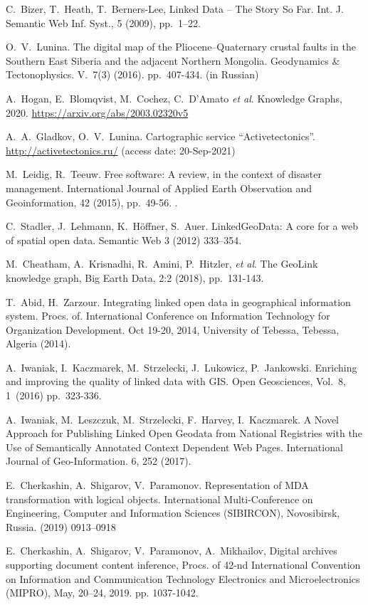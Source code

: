 \documentclass[
]{ceurart}
\begin{document}
\begin{thebibliography}{99}

 C.~Bizer, T.~Heath, T.~Berners-Lee, Linked Data -- The Story So Far. Int. J. Semantic Web Inf. Syst., 5 (2009), pp.~1--22. 

 O.~V.~Lunina.  The digital map of the Pliocene–Quaternary crustal faults in the Southern East Siberia and the adjacent Northern Mongolia. Geodynamics \& Tectonophysics.  V.~7(3) (2016). pp.~407-434. (in Russian) 

 A.~Hogan, E.~Blomqvist, M.~Cochez, C.~D’Amato \emph{et al}. Knowledge Graphs, 2020. \url{https://arxiv.org/abs/2003.02320v5}

 A.~A.~Gladkov, O.~V.~Lunina. Cartographic service ``Activetectonics''. \url{http://activetectonics.ru/} (access date: 20-Sep-2021)

 M.~Leidig, R.~Teeuw. Free software: A review, in the context of disaster management. International Journal of Applied Earth Observation and Geoinformation, 42 (2015), pp.~49-56. .

 C.~Stadler, J.~Lehmann, K.~Höffner, S.~Auer. LinkedGeoData: A core for a web of spatial open data. Semantic Web 3 (2012) 333–354. 

 M.~Cheatham, A.~Krisnadhi, R.~Amini, P.~Hitzler, \emph{et al}. The GeoLink knowledge graph, Big Earth Data, 2:2 (2018), pp.~131-143. 

 T.~Abid, H.~Zarzour. Integrating linked open data in geographical information system. Procs. of. International Conference on Information Technology for Organization Development. Oct 19-20, 2014, University of Tebessa, Tebessa, Algeria (2014).

 A.~Iwaniak, I.~Kaczmarek, M.~Strzelecki, J.~Lukowicz, P.~Jankowski. Enriching and improving the quality of linked data with GIS. Open Geosciences, Vol.~8, 1~(2016) pp.~323-336. 

 A.~Iwaniak, M.~Leszczuk, M.~Strzelecki, F.~Harvey, I.~Kaczmarek. A Novel Approach for Publishing Linked Open Geodata from National Registries with the Use of Semantically Annotated Context Dependent Web Pages. International Journal of Geo-Information. 6, 252 (2017). 

 E.~Cherkashin, A.~Shigarov, V.~Paramonov. Representation of MDA transformation with logical objects. International Multi-Conference on Engineering, Computer and Information Sciences (SIBIRCON), Novosibirsk, Russia. (2019) 0913--0918 

 E.~Cherkashin, A.~Shigarov, V.~Paramonov, A.~Mikhailov, Digital archives supporting document content inference, Procs. of 42-nd International Convention on Information and Communication Technology Electronics and Microelectronics (MIPRO), May, 20–24, 2019. pp. 1037-1042. 
\end{thebibliography}
\end{document}
